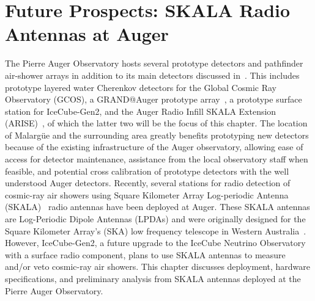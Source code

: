 %
%
\chapter{Future Prospects: SKALA Radio Antennas at Auger}\label{chap:skala}

\begin{publishedin}
\pubsep
{}
\pubsep
{}
\end{publishedin}

The Pierre Auger Observatory hosts several prototype detectors and pathfinder air-shower arrays in addition to its main detectors discussed in~.
This includes prototype layered water Cherenkov detectors for the Global Cosmic Ray Observatory (GCOS), a GRAND@Auger prototype array~\cite{deerrico_icrc2025_grandatauger}, a prototype surface station for IceCube-Gen2, and the Auger Radio Infill SKALA Extension (ARISE)~\cite{isvhecri2026_flaggs_arise}, of which the latter two will be the focus of this chapter.
The location of Malarg\"ue and the surrounding area greatly benefits prototyping new detectors because of the existing infrastructure of the Auger observatory, allowing ease of access for detector maintenance, assistance from the local observatory staff when feasible, and potential cross calibration of prototype detectors with the well understood Auger detectors.
Recently, several stations for radio detection of cosmic-ray air showers using Square Kilometer Array Log-periodic Antenna (SKALA)~\cite{SKALA2015_eloy} radio antennas have been deployed at Auger.
These SKALA antennas are Log-Periodic Dipole Antennas (LPDAs) and were originally designed for the Square Kilometer Array's (SKA) low frequency telescope in Western Australia~\cite{SKA_designreport}.
However, IceCube-Gen2, a future upgrade to the IceCube Neutrino Observatory with a surface radio component, plans to use SKALA antennas to measure and/or veto cosmic-ray air showers.
This chapter discusses deployment, hardware specifications, and preliminary analysis from SKALA antennas deployed at the Pierre Auger Observatory.

